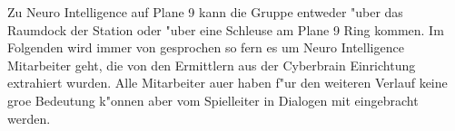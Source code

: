 
Zu Neuro Intelligence auf Plane 9 kann die Gruppe entweder "uber das Raumdock der Station oder "uber eine Schleuse am Plane 9 Ring kommen. Im Folgenden wird immer von \ml{} gesprochen so fern es um Neuro Intelligence Mitarbeiter geht, die von den Ermittlern aus der Cyberbrain Einrichtung extrahiert wurden. Alle Mitarbeiter au\3er \ml{} haben f"ur den weiteren Verlauf keine gro\3e Bedeutung k"onnen aber vom Spielleiter in Dialogen mit eingebracht werden.
